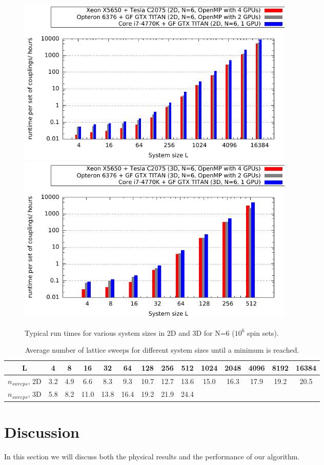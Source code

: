 \documentclass[paper=a4, fontsize=11pt]{scrartcl} %
\numberwithin{equation}{section} %
\numberwithin{figure}{section} %
\numberwithin{table}{section} %
\begin{document}
\begin{figure}
\centering
\includegraphics[width=0.65\textwidth]{images/perf_time2d.pdf}
\includegraphics[width=0.65\textwidth]{images/perf_time3d.pdf}
\caption{Typical run times for various system sizes in 2D and 3D for N=6 ($10^6$ spin sets).}
\label{fig:perf_times}
\end{figure}

\begin{table}
\centering
  \begin{tabular}{| c | c | c | c | c | c | c | c | c | c | c | c | c | c |}
    \hline
    L & 4 & 8 & 16 & 32 & 64 & 128 & 256 & 512 & 1024 & 2048 & 4096 & 8192 & 16384 \\ \hline
	$n_{sweeps}$, 2D & 3.2 & 4.9 &  6.6 &  8.3 &  9.3 & 10.7 & 12.7 & 13.6 & 15.0 & 16.3 & 17.9 & 19.2 & 20.5 \\ \hline
	$n_{sweeps}$, 3D & 5.8 & 8.2 & 11.0 & 13.8 & 16.4 & 19.2 & 21.9 & 24.4 &      &      &      &      &      \\ \hline
  \end{tabular}
  \caption{Average number of lattice sweeps for different system sizes until a minimum is reached.}
  \label{tab:avg_sweeps}
\end{table}


\section{Discussion}
\label{sec:discussion}
In this section we will discuss both the physical results and the performance of our algorithm.
\end{document}
